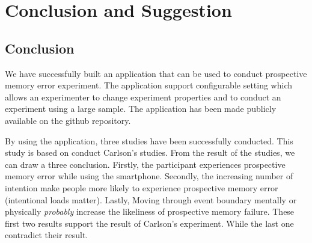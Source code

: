 \chapter{Conclusion and Suggestion}
\section{Conclusion}


We have successfully built an application that can be used to conduct prospective memory error experiment.
The application support configurable setting which allows an experimenter to change experiment properties and to conduct
an experiment using a large sample. The application has been made publicly available on the github repository.

By using the application, three studies have been successfully conducted.
This study is based on conduct Carlson's studies. From the result of the studies,
we can draw a three conclusion. Firstly, the participant experiences prospective memory error while using the smartphone.
Secondly, the increasing number of intention make people more likely to experience prospective memory error (intentional loads matter).
Lastly, Moving through event boundary mentally or physically \textit{probably} increase the likeliness of prospective memory failure.
These first two results support the result of Carlson's experiment. While the last one
contradict their result.



